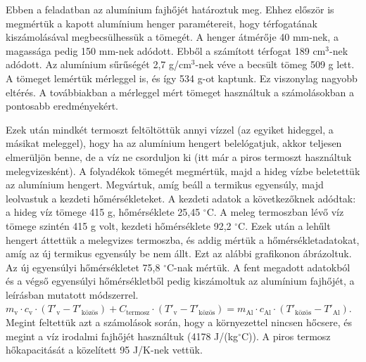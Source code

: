 \documentclass{article}
\begin{document}
Ebben a feladatban az alumínium fajhőjét határoztuk meg. Ehhez először is megmértük a kapott alumínium henger paramétereit, hogy térfogatának kiszámolásával megbecsülhessük a tömegét. A henger átmérője 40 mm-nek, a magassága pedig 150 mm-nek adódott. Ebből a számított térfogat 189 cm$^3$-nek adódott. Az alumínium sűrűségét 2,7 g/cm$^3$-nek véve a becsült tömeg 509 g lett. A tömeget lemértük mérleggel is, és így 534 g-ot kaptunk. Ez viszonylag nagyobb eltérés. A továbbiakban a mérleggel mért tömeget használtuk a számolásokban a pontosabb eredményekért. 

Ezek után mindkét termoszt feltöltöttük annyi vízzel (az egyiket hideggel, a másikat meleggel), hogy ha az alumínium hengert belelógatjuk, akkor teljesen elmerüljön benne, de a víz ne csorduljon ki (itt már a piros termoszt használtuk melegvizesként). A folyadékok tömegét megmértük, majd a hideg vízbe beletettük az alumínium hengert. Megvártuk, amíg beáll a termikus egyensúly, majd leolvastuk a kezdeti hőmérsékleteket. A kezdeti adatok a következőknek adódtak: a hideg víz tömege 415 g, hőmérséklete 25,45 $^{\circ}$C. A meleg termoszban lévő víz tömege szintén 415 g volt, kezdeti hőmérséklete 92,2 $^{\circ}$C. Ezek után a lehűlt hengert áttettük a melegvizes termoszba, és addig mértük a hőmérsékletadatokat, amíg az új termikus egyensúly be nem állt. Ezt az alábbi grafikonon ábrázoltuk. Az új egyensúlyi hőmérsékletet 75,8 $^{\circ}$C-nak mértük. A fent megadott adatokból és a végső egyensúlyi hőmérsékletből pedig kiszámoltuk az alumínium fajhőjét, a leírásban mutatott módszerrel. 
$m_{\text{v}} \cdot c_{\text{v}} \cdot (T'_{\text{v}} - T'_{\text{közös}}) + C_{\text{termosz}} \cdot (T'_{\text{v}} - T'_{\text{közös}}) = m_{\text{Al}} \cdot c_{\text{Al}} \cdot (T'_{\text{közös}} - T'_{\text{Al}}).$
Megint feltettük azt a számolások során, hogy a környezettel nincsen hőcsere, és megint a víz irodalmi fajhőjét használtuk (4178 J/(kg$^{\circ}$C)). A piros termosz hőkapacitását a közelített 95 J/K-nek vettük. 

\end{document}

